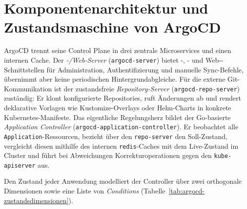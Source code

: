 \section{Komponentenarchitektur und Zustandsmaschine von ArgoCD}
\label{sec:komponentenarchitektur-argocd}

ArgoCD trennt seine Control Plane in drei zentrale Microservices und einen internen Cache.\autocite{argocd_architecture_2026} Der \textit{-/Web-Server} (\texttt{argocd-\allowbreak{}server}) bietet -, - und Web--Schnittstellen für Administration, Authentifizierung und manuelle Sync-Befehle, übernimmt aber keine periodischen Hintergrundabgleiche. Für die externe Git-Kommunikation ist der zustandsfreie \textit{Repository-Server} (\texttt{argocd-\allowbreak{}repo-\allowbreak{}server}) zuständig: Er klont konfigurierte Repositories, ruft Änderungen ab und rendert deklarative Vorlagen wie Kustomize-Overlays oder Helm-Charts in konkrete Kubernetes-Manifeste.\autocite{argocd_architecture_2026,kubernetes_kustomize_2026} Das eigentliche Regelungsherz bildet der Go-basierte \textit{Application Controller} (\texttt{argocd-application-controller}). Er beobachtet alle \texttt{Application}-Ressourcen, bezieht über den \texttt{repo-server} den Soll-Zustand, vergleicht diesen mithilfe des internen \texttt{redis}-Caches mit dem Live-Zustand im Cluster und führt bei Abweichungen Korrekturoperationen gegen den \texttt{kube-apiserver} aus.\autocite{argocd_architecture_2026}

Den Zustand jeder Anwendung modelliert der Controller über zwei orthogonale Dimensionen sowie eine Liste von \textit{Conditions} (Tabelle~\ref{tab:argocd-zustandsdimensionen}).

